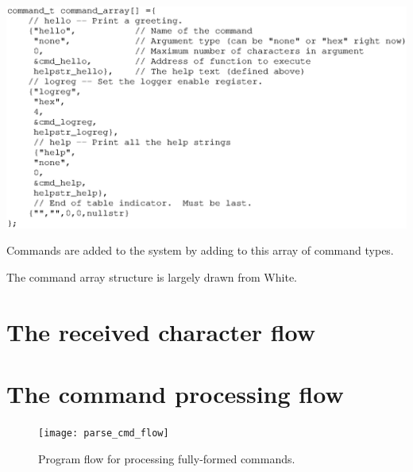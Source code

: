 \begin{listing}[ht]
    \begin{center}
        \includegraphics[clip,scale=.75]{command_array}
        \caption{Commands are added to the system by adding to this array of command types.\label{lst:cmdarray}}
    \end{center}
\end{listing}

The command array structure is largely drawn from White\cite{bok:white2012}.



\clearpage{}
\section{The received character flow}








\clearpage{}
\section{The command processing flow}

\begin{figure}[ht]
    \begin{center}
        \texttt{[image: parse\_cmd\_flow]}
        \caption{Program flow for processing fully-formed commands.\label{fig:cmdflow}}
    \end{center}
\end{figure}






